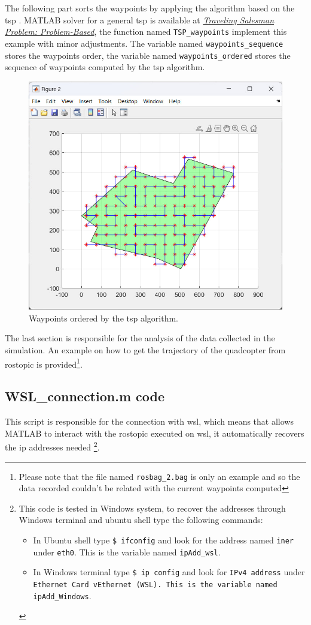 The following part sorts the waypoints by applying the algorithm based on the \ac{tsp} \cite{tsp_wikipedia}. MATLAB solver for a general \ac{tsp} is available at \href{https://it.mathworks.com/help/optim/ug/traveling-salesman-problem-based.html}{\textit{Traveling Salesman Problem: Problem-Based}}, the function named \texttt{TSP\_waypoints} implement this example with minor adjustments. The variable named \texttt{waypoints\_sequence} stores the waypoints order, the variable named \texttt{waypoints\_ordered} stores the sequence of waypoints computed by the \ac{tsp} algorithm.

\begin{figure}[hbt!]
	\centering
	\includegraphics[width=.7\linewidth]{images/waypoints_ordered}
	\caption{Waypoints ordered by the \ac{tsp} algorithm.}
\end{figure}

The last section is responsible for the analysis of the data collected in the simulation. An example on how to get the trajectory of the quadcopter from rostopic is provided\footnote{Please note that the file named \texttt{rosbag\_2.bag} is only an example and so the data recorded couldn't be related with the current waypoints computed}.

\subsection*{WSL\_connection.m code}
This script is responsible for the connection with \ac{wsl}, which means that allows MATLAB to interact with the rostopic executed on \ac{wsl}, it automatically recovers the ip addresses needed
\footnote{This code is tested in Windows system, to recover the addresses through Windows terminal and ubuntu shell type the following commands: 
\begin{itemize}
	\item In Ubuntu shell type \texttt{\$ ifconfig} and look for the address named \texttt{iner} under \texttt{eth0}. This is the variable named \texttt{ipAdd\_wsl}.
	\item In Windows terminal type \texttt{\$ ip config} and look for \texttt{IPv4 address} under \texttt{Ethernet Card vEthernet (WSL). This is the variable named \texttt{ipAdd\_Windows}}.
\end{itemize}}.


